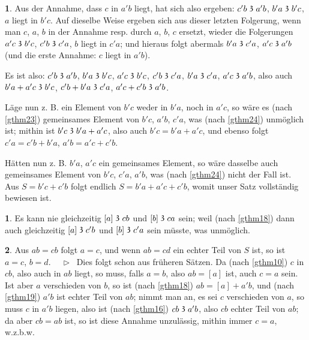 \documentclass[leqno,hidelinks]{article}
\theoremstyle{definition}
\newtheorem{satz}{\protect\satzname}
\newtheorem*{zusatz}{\protect\zusatzname}
\newcommand{\satzname}{}
\newcommand{\zusatzname}{}
\renewcommand{\satzname}{\hspace{-4pt}.\ Satz}%
\renewcommand{\zusatzname}{Zusatz}%
\renewcommand{\satzname}{\hspace{-4pt}.\ Theorem}%
\renewcommand{\zusatzname}{Corollary}%
\newcommand\Beweis{\medskip \newline $ \phantom{'.'} \rhd \ $}%
\newcommand\TeilVon{\mathrel{\raisebox{0.45ex}{$\mathfrak{3}$}}}
\newcommand{\sref}[1]{\underline{\ref{#1}}}%
\begin{document}
\begin{paracol}{2}
\begin{satz}
Aus der Annahme, dass $c$ in $a'b$ liegt, hat sich also ergeben: $c'b \TeilVon a'b$,
$b'a \TeilVon b'c$, $a$ liegt in $b'c$. Auf dieselbe Weise ergeben sich aus
dieser letzten Folgerung, wenn man $c$, $a$, $b$ in der Annahme resp. durch $a$,
$b$, $c$ ersetzt, wieder die Folgerungen $a'c \TeilVon b'c$, $c'b \TeilVon c'a$,
$b$ liegt in $c'a$; und hieraus folgt abermals $b'a \TeilVon c'a$,
$a'c \TeilVon a'b$ (und die erste Annahme: $c$ liegt in $a'b$).

Es ist also: $c'b \TeilVon a'b$, $b'a \TeilVon b'c$, $a'c \TeilVon b'c$,
$c'b \TeilVon c'a$, $b'a \TeilVon c'a$, $a'c \TeilVon a'b$, also auch
$b'a + a'c \TeilVon b'c$, $c'b + b'a \TeilVon c'a$, $a'c + c'b \TeilVon a'b$.

\newpage

Läge nun z. B. ein Element von $b'c$ weder in $b'a$, noch in $a'c$,
so wäre es (nach \sref{gthm23}) gemeinsames Element von $b'c$, $a'b$, $c'a$, was
(nach \sref{gthm24}) unmöglich ist; mithin ist $b'c \TeilVon b'a + a'c$, also
auch $b'c = b'a + a'c$, und ebenso folgt $c'a = c'b + b'a$, $a'b = a'c + c'b$.

Hätten nun z. B. $b'a$, $a'c$ ein gemeinsames Element, so wäre dasselbe
auch gemeinsames Element von $b'c$, $c'a$, $a'b$, was (nach \sref{gthm24})
nicht der Fall ist. Aus $S = b'c + c'b$ folgt endlich $S = b'a + a'c + c'b$,
womit unser Satz vollständig bewiesen ist.
\end{satz}

\begin{zusatz}\label{zusatz2}
Es kann nie gleichzeitig $[a] \TeilVon cb$ und $[b] \TeilVon ca$ sein;
weil (nach \sref{gthm18}) dann auch gleichzeitig $[a] \TeilVon c'b$ und
$[b] \TeilVon c'a$  sein müsste, was unmöglich.
\end{zusatz}

\begin{satz}\label{gthm26}
Aus $ab = cb$ folgt $a = c$, und wenn $ab = cd$ ein echter Teil von $S$ ist,
so ist $a = c$, $b = d$.
\Beweis
Dies folgt schon aus früheren Sätzen. Da (nach \sref{gthm10}) $c$ in $cb$, also
auch in $ab$ liegt, so muss, falls $a = b$, also $ab = [a]$ ist, auch $c = a$ sein.
Ist aber $a$ verschieden von $b$, so ist (nach \sref{gthm18}) $ab = [a] + a'b$, und
(nach \sref{gthm19}) $a'b$ ist echter Teil von $ab$; nimmt man an, es sei $c$
verschieden von $a$, so muss $c$ in $a'b$ liegen, also ist (nach \sref{gthm16})
$cb \TeilVon a'b$, also $cb$ echter Teil von $ab$; da aber $cb = ab$ ist, so ist
diese Annahme unzulässig, mithin immer $c = a$, w.z.b.w.


\end{satz}
\end{paracol}
\end{document}
